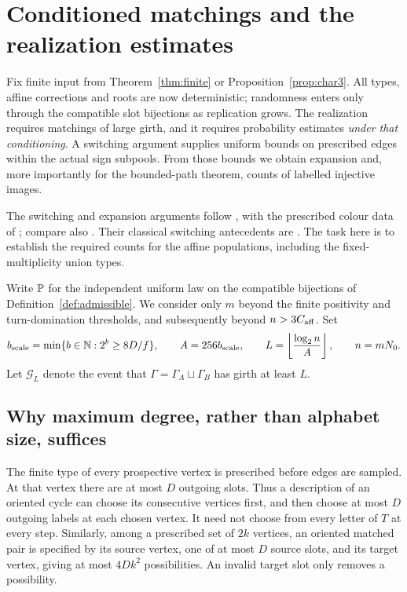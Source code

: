 \section{Conditioned matchings and the realization estimates}\label{sec:matchings}
Fix finite input from Theorem~\ref{thm:finite} or Proposition~\ref{prop:char3}. All types, affine corrections and roots are now deterministic; randomness enters only through the compatible slot bijections as replication grows. The realization requires matchings of large girth, and it requires probability estimates \emph{under that conditioning}. A switching argument supplies uniform bounds on prescribed edges within the actual sign subpools. From those bounds we obtain expansion and, more importantly for the bounded-path theorem, counts of labelled injective images.

The switching and expansion arguments follow \cite[Section~3.3, Lemma~3.3 and Proposition~3.4]{OAI197a}, with the prescribed colour data of \cite[Construction~4.1 and Section~6.1]{Iva26}; compare also \cite[Proposition~7.9]{MD26}. Their classical switching antecedents are \cite{McK81,MW91}. The task here is to establish the required counts for the affine populations, including the fixed-multiplicity union types.

Write $\mathbb P$ for the independent uniform law on the compatible bijections of Definition~\ref{def:admissible}. We consider only $m$ beyond the finite positivity and turn-domination thresholds, and subsequently beyond $n>3C_{\rm aff}$. Set
\begin{equation}\label{eq:girth-scale}
 b_{\rm scale}=\min\{b\in\mathbb N:2^b\ge8D/f\},\qquad
 A=256b_{\rm scale},\qquad
 L=\left\lfloor \frac{\log_2 n}{A}\right\rfloor,\qquad n=mN_0.
\end{equation}
Let $\mathcal G_L$ denote the event that $\Gamma=\Gamma_A\sqcup\Gamma_B$ has girth at least $L$.

\subsection{Why maximum degree, rather than alphabet size, suffices}
The finite type of every prospective vertex is prescribed before edges are sampled. At that vertex there are at most $D$ outgoing slots. Thus a description of an oriented cycle can choose its consecutive vertices first, and then choose at most $D$ outgoing labels at each chosen vertex. It need not choose from every letter of $T$ at every step. Similarly, among a prescribed set of $2k$ vertices, an oriented matched pair is specified by its source vertex, one of at most $D$ source slots, and its target vertex, giving at most $4Dk^2$ possibilities. An invalid target slot only removes a possibility.

